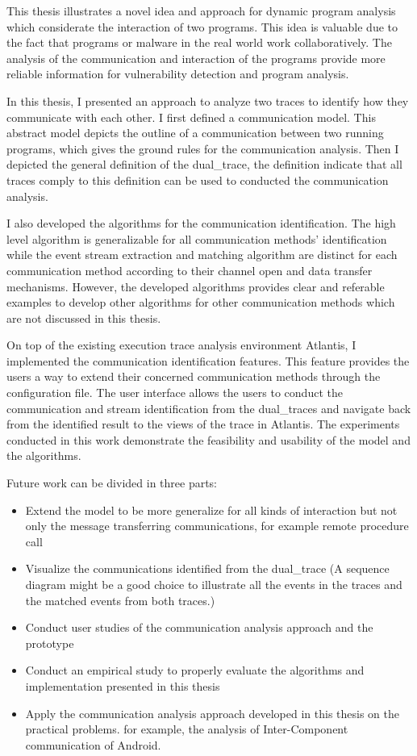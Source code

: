 \label{concl}
This thesis illustrates a novel idea and approach for dynamic program analysis which considerate the interaction of two programs. This idea is valuable due to the fact that programs or malware in the real world work collaboratively. The analysis of the communication and interaction of the programs provide more reliable information for vulnerability detection and program analysis.

In this thesis, I presented an approach to analyze two traces to identify how they communicate with each other. I first defined a communication model. This abstract model depicts the outline of a communication between two running programs, which gives the ground rules for the communication analysis. Then I depicted the general definition of the dual\_trace, the definition indicate that all traces comply to this definition can be used to conducted the communication analysis.

I also developed the algorithms for the communication identification. The high level algorithm is generalizable for all communication methods' identification while  the event stream extraction and matching algorithm are distinct for each communication method according to their channel open and data transfer mechanisms. However, the developed algorithms provides clear and referable examples to develop other algorithms for other communication methods which are not discussed in this thesis.

On top of the existing execution trace analysis environment Atlantis, I implemented the communication identification features. This feature provides the users a way to extend their concerned communication methods through the configuration file. The user interface allows the users to conduct the communication and stream identification from the dual\_traces and navigate back from the identified result to the views of the trace in Atlantis. The experiments conducted in this work demonstrate the feasibility and usability of the model and the algorithms. 


Future work can be divided in three parts:
\begin{itemize}
\item Extend the model to be more generalize for all kinds of interaction but not only the message transferring communications, for example remote procedure call
\item Visualize the communications identified from the dual\_trace (A sequence diagram might be a good choice to illustrate all the events in the traces and the matched events from both traces.) 
\item Conduct user studies of the communication analysis approach and the prototype
\item Conduct an empirical study to properly evaluate the algorithms and implementation presented in this thesis
\item Apply the communication analysis approach developed in this thesis on the practical problems. for example, the analysis of Inter-Component communication of Android. 
\end{itemize}


